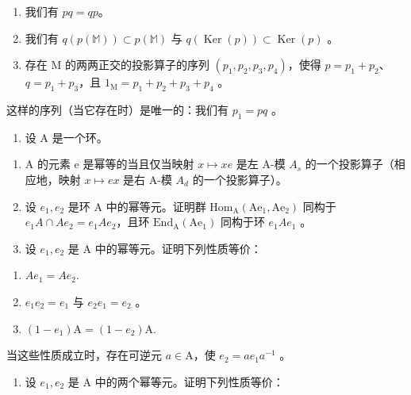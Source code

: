 \begin{enumerate}
\def\labelenumi{(\roman{enumi})}
\item
  我们有 \(pq = qp\)。
\item
  我们有 \(q(p(\mathbb{M})) \subset p(\mathbb{M})\) 与 \(q(\operatorname{Ker}(p)) \subset \operatorname{Ker}(p)\) 。
\item
  存在 M 的两两正交的投影算子的序列 \((p_1, p_2, p_3, p_4)\)，使得 \(p = p_1 + p_2\)、\(q = p_1 + p_3\)，且 \(1_{\mathrm{M}} = p_1 + p_2 + p_3 + p_4\) 。
\end{enumerate}

这样的序列（当它存在时）是唯一的：我们有 \(p_{1} = pq\) 。

\begin{enumerate}
\def\labelenumi{\arabic{enumi})}
\setcounter{enumi}{4}
\tightlist
\item
  设 \(\mathrm{A}\) 是一个环。
\end{enumerate}

\begin{enumerate}
\def\labelenumi{\alph{enumi})}
\item
  A 的元素 e 是幂等的当且仅当映射 \(x \mapsto xe\) 是左 A-模 \(A_{s}\) 的一个投影算子（相应地，映射 \(x \mapsto ex\) 是右 A-模 \(A_{d}\) 的一个投影算子）。
\item
  设 \(e_{1}, e_{2}\) 是环 A 中的幂等元。证明群 \(\mathrm{Hom}_{\mathrm{A}}(\mathrm{Ae}_{1}, \mathrm{Ae}_{2})\) 同构于 \(e_{1}A \cap Ae_{2} = e_{1}Ae_{2}\)，且环 \(\mathrm{End}_{\mathrm{A}}(\mathrm{Ae}_{1})\) 同构于环 \(e_{1}Ae_{1}\) 。
\item
  设 \(e_1, e_2\) 是 A 中的幂等元。证明下列性质等价：
\end{enumerate}

\begin{enumerate}
\def\labelenumi{(\roman{enumi})}
\item
  \(Ae_{1} = Ae_{2}.\)
\item
  \(e_{1}e_{2}=e_{1}\) 与 \(e_{2}e_{1}=e_{2}\) 。
\item
  \((1 - e_{1})\mathrm{A} = (1 - e_{2})\mathrm{A}.\)
\end{enumerate}

当这些性质成立时，存在可逆元 \(a \in \mathrm{A}\)，使 \(e_2 = ae_1a^{-1}\) 。

\begin{enumerate}
\def\labelenumi{\alph{enumi})}
\setcounter{enumi}{3}
\tightlist
\item
  设 \(e_{1}, e_{2}\) 是 A 中的两个幂等元。证明下列性质等价：
\end{enumerate}

